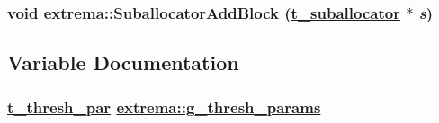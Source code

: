 \hypertarget{namespaceextrema_f6d0202116fc2bffdeaa457b528063c5}{
\subsubsection[SuballocatorAddBlock]{\setlength{\rightskip}{0pt plus 5cm}void extrema::Suballocator\-Add\-Block (\hyperlink{namespaceextrema_6be19e858e73efb5002c6ee94bba43fb}{t\_\-suballocator} $\ast$ {\em s})}}
\label{namespaceextrema_f6d0202116fc2bffdeaa457b528063c5}




\subsection{Variable Documentation}
\hypertarget{namespaceextrema_f4f063a8b77240d1f9e60783393438f1}{
\subsubsection[g\_\-thresh\_\-params]{\setlength{\rightskip}{0pt plus 5cm}\hyperlink{structextrema_1_1s__thresh__par}{t\_\-thresh\_\-par} \hyperlink{namespaceextrema_f4f063a8b77240d1f9e60783393438f1}{extrema::g\_\-thresh\_\-params}}}
\label{namespaceextrema_f4f063a8b77240d1f9e60783393438f1}


